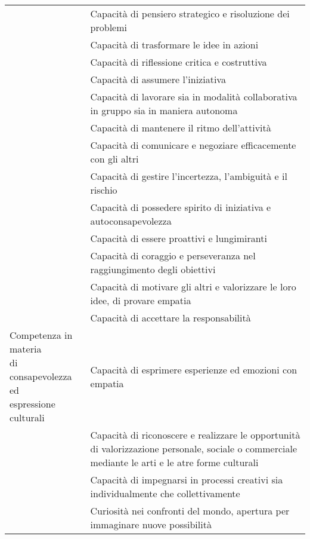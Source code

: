 \begin{adjustbox}{max width=\textwidth}
\begin{tabular}{m{4cm}p{12.0cm}}
&Capacità di pensiero strategico e risoluzione dei problemi\\
& Capacità di trasformare le idee in azioni\\
& Capacità di riflessione critica e costruttiva \\
	&Capacità di assumere l'iniziativa\\
	& Capacità di lavorare sia in modalità collaborativa in gruppo sia in maniera autonoma\\
	& Capacità di mantenere il ritmo dell'attività\\
	& Capacità di comunicare e negoziare efficacemente con gli altri\\
	& Capacità di gestire l'incertezza, l'ambiguità e il rischio\\
	& Capacità di possedere spirito di iniziativa e autoconsapevolezza\\
	& Capacità di essere proattivi e lungimiranti\\
	& Capacità di coraggio e perseveranza nel raggiungimento degli obiettivi\\
	& Capacità di motivare gli altri e valorizzare le loro idee, di provare empatia\\
	& Capacità di accettare la responsabilità  \\
	\midrule
	\multirowcell{3}{Competenza in materia\\ di
		consapevolezza ed\\ espressione culturali
}& Capacità di esprimere esperienze ed emozioni con empatia\\
	& Capacità di riconoscere e realizzare le opportunità di valorizzazione personale,
sociale o commerciale mediante le arti e le atre forme culturali\\
& Capacità di impegnarsi in processi creativi sia individualmente che collettivamente\\
& Curiosità nei confronti del mondo, apertura per immaginare nuove possibilità\\
\bottomrule
\end{tabular}
\end{adjustbox}
